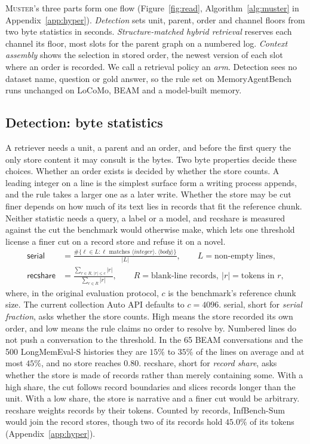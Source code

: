 \documentclass{article}
\newcommand{\sys}{\textsc{Muster}}
\newcommand{\serial}{\textsf{serial}}
\newcommand{\cov}{\textsf{recshare}}
\begin{document}
\sys{}'s three parts form one flow (Figure~\ref{fig:read}, Algorithm~\ref{alg:muster} in Appendix~\ref{app:hyper}). \emph{Detection} sets unit, parent, order and channel floors from two byte statistics in seconds. \emph{Structure-matched hybrid retrieval} reserves each channel its floor, most slots for the parent graph on a numbered log. \emph{Context assembly} shows the selection in stored order, the newest version of each slot where an order is recorded. We call a retrieval policy an \emph{arm}. Detection sees no dataset name, question or gold answer, so the rule set on MemoryAgentBench runs unchanged on LoCoMo, BEAM and a model-built memory.

\subsection{Detection: byte statistics}\label{sec:stats}

A retriever needs a unit, a parent and an order, and before the first query the only store content it may consult is the bytes. Two byte properties decide these choices. Whether an order exists is decided by whether the store counts. A leading integer on a line is the simplest surface form a writing process appends, and the rule takes a larger one as a later write. Whether the store may be cut finer depends on how much of its text lies in records that fit the reference chunk. Neither statistic needs a query, a label or a model, and \cov{} is measured against the cut the benchmark would otherwise make, which lets one threshold license a finer cut on a record store and refuse it on a novel.
\begin{align}
\serial &= \frac{\#\{\ell \in L : \ell \text{ matches } \langle\textit{integer}\rangle\texttt{.}\ \langle\textit{body}\rangle\}}{|L|},
\qquad L = \text{non-empty lines}, \\
\cov &= \frac{\sum_{r \in R,\, |r| \le c} |r|}{\sum_{r \in R} |r|},
\qquad R = \text{blank-line records},\ |r| = \text{tokens in } r,
\end{align}
where, in the original evaluation protocol, $c$ is the benchmark's reference chunk size. The current collection Auto API defaults to $c=4096$.
\serial{}, short for \emph{serial fraction}, asks whether the store counts. High means the store recorded its own order, and low means the rule claims no order to resolve by. Numbered lines do not push a conversation to the threshold. In the 65 BEAM conversations and the 500 LongMemEval-S histories \cite{longmemeval} they are $15\%$ to $35\%$ of the lines on average and at most $45\%$, and no store reaches $0.80$. \cov{}, short for \emph{record share}, asks whether the store is made of
records rather than merely containing some. With a high share, the cut follows record boundaries and slices records longer than the unit.
With a low share, the store is narrative and a finer cut would be arbitrary. \cov{} weights records by their tokens. Counted by records, InfBench-Sum would join the record stores, though two of its records hold $45.0\%$ of its tokens (Appendix~\ref{app:hyper}).
\end{document}
